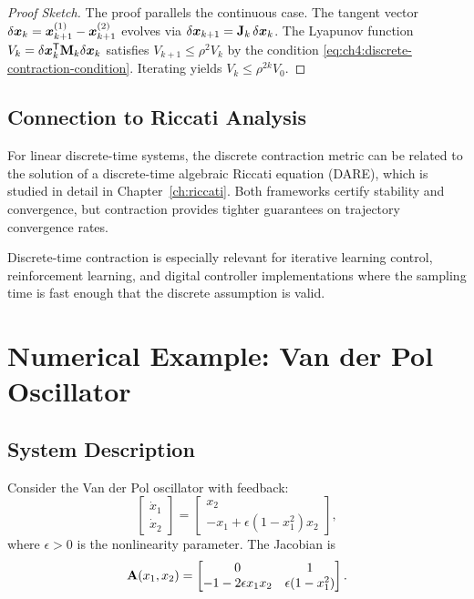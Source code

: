 \begin{proof}[Proof Sketch]
The proof parallels the continuous case. The tangent vector $\delta\bm{x}_k = \bm{x}_{k+1}^{(1)} - \bm{x}_{k+1}^{(2)}$
evolves via $\delta\bm{x}_{k+1} = \mathbf{J}_k \, \delta\bm{x}_k$. The Lyapunov function
$V_k = \delta\bm{x}_k^{\mathsf{T}} \mathbf{M}_k \delta\bm{x}_k$ satisfies $V_{k+1} \leq \rho^2 V_k$ by the condition
\eqref{eq:ch4:discrete-contraction-condition}. Iterating yields $V_k \leq \rho^{2k} V_0$.
\end{proof}

\subsection{Connection to Riccati Analysis}

For linear discrete-time systems, the discrete contraction metric can be related to
the solution of a discrete-time algebraic Riccati equation (DARE), which is studied
in detail in Chapter~\ref{ch:riccati}. Both frameworks certify stability and convergence,
but contraction provides tighter guarantees on trajectory convergence rates.

\begin{remark}
Discrete-time contraction is especially relevant for iterative learning control,
reinforcement learning, and digital controller implementations where the sampling time
is fast enough that the discrete assumption is valid.
\end{remark}


\section{Numerical Example: Van der Pol Oscillator}

\subsection{System Description}

Consider the Van der Pol oscillator with feedback:
\begin{equation}
\begin{bmatrix} \dot{x}_1 \\ \dot{x}_2 \end{bmatrix}
= \begin{bmatrix} x_2 \\ -x_1 + \epsilon(1-x_1^2)x_2 \end{bmatrix},
\label{eq:ch4:vdp-system}
\end{equation}
where $\epsilon > 0$ is the nonlinearity parameter. The Jacobian is
\begin{equation}
\mathbf{A}(x_1,x_2) = \begin{bmatrix} 0 & 1 \\ -1 - 2\epsilon x_1 x_2 & \epsilon(1-x_1^2) \end{bmatrix}.
\label{eq:ch4:vdp-jacobian}
\end{equation}

